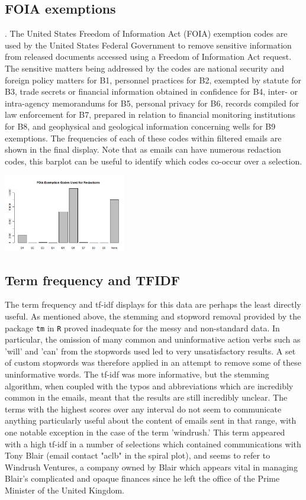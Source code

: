 \documentclass[journal]{vgtc}                %
\begin{document}
\subsection{FOIA exemptions}.
 The United States Freedom of Information Act (FOIA) exemption codes \cite{FOIA} are used by the United States Federal Government to remove sensitive information from released documents accessed using a Freedom of Information Act request. The sensitive matters being addressed by the codes are national security and foreign policy matters for B1, personnel practices for B2, exempted by statute for B3, trade secrets or financial information obtained in confidence for B4, inter- or intra-agency memorandums for B5, personal privacy for B6, records compiled for law enforcement for B7, prepared in relation to financial monitoring institutions for B8, and geophysical and geological information concerning wells for B9 exemptions. The frequencies of each of these codes within filtered emails are shown in the final display. Note that as emails can have numerous redaction codes, this barplot can be useful to identify which codes co-occur over a selection.
 
 \includegraphics[width=0.4\textwidth]{ExemptionsFullTime}

\subsection{Term frequency and TFIDF}
The term frequency and tf-idf displays for this data are perhaps the least directly useful. As mentioned above, the stemming and stopword removal provided by the package \texttt{tm} in \texttt{R} proved inadequate for the messy and non-standard data. In particular, the omission of many common and uninformative action verbs such as 'will' and 'can' from the stopwords used led to very unsatisfactory results. A set of custom stopwords was therefore applied in an attempt to remove some of these uninformative words. The tf-idf was more informative, but the stemming algorithm, when coupled with the typos and abbreviations which are incredibly common in the emails, meant that the results are still incredibly unclear. The terms with the highest scores over any interval do not seem to communicate anything particularly useful about the content of emails sent in that range, with one notable exception in the case of the term 'windrush.' This term appeared with a high tf-idf in a number of selections which contained communications with Tony Blair (email contact "aclb" in the spiral plot), and seems to refer to Windrush Ventures, a company owned by Blair which appears vital in managing Blair's complicated and opaque finances since he left the office of the Prime Minister of the United Kingdom. \cite{windrushTelegraph, windrushGuardian}
\end{document}
